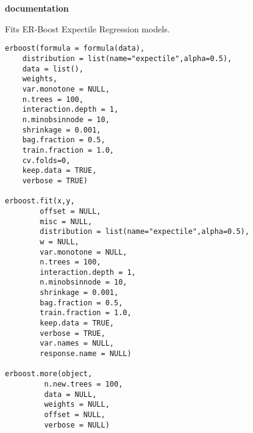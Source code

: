 \documentclass[a4paper]{book}
\begin{document}
\chapter*{}
\begin{center}
{\textbf{\huge \R{} documentation}} \par{}
\par\bigskip{\large \today}
\end{center}
%
\begin{Description}\relax
Fits ER-Boost Expectile Regression models.
\end{Description}
%
\begin{Usage}
\begin{verbatim}
erboost(formula = formula(data),
    distribution = list(name="expectile",alpha=0.5),
    data = list(),
    weights,
    var.monotone = NULL,
    n.trees = 100,
    interaction.depth = 1,
    n.minobsinnode = 10,
    shrinkage = 0.001,
    bag.fraction = 0.5,
    train.fraction = 1.0,
    cv.folds=0,
    keep.data = TRUE,
    verbose = TRUE)

erboost.fit(x,y,
        offset = NULL,
        misc = NULL,
        distribution = list(name="expectile",alpha=0.5),
        w = NULL,
        var.monotone = NULL,
        n.trees = 100,
        interaction.depth = 1,
        n.minobsinnode = 10,
        shrinkage = 0.001,
        bag.fraction = 0.5,
        train.fraction = 1.0,
        keep.data = TRUE,
        verbose = TRUE,
        var.names = NULL,
        response.name = NULL)

erboost.more(object,
         n.new.trees = 100,
         data = NULL,
         weights = NULL,
         offset = NULL,
         verbose = NULL)
\end{verbatim}
\end{Usage}
%
\end{document}

